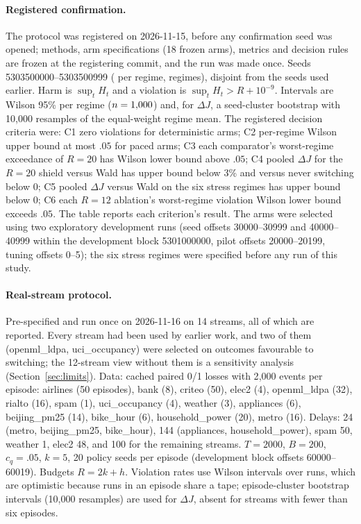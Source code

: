 \documentclass[10pt]{article}
\theoremstyle{plain}
\theoremstyle{definition}
\begin{document}
\paragraph{Registered confirmation.}
The protocol was registered on 2026-11-15, before any confirmation seed was opened; methods, arm specifications (18 frozen arms), metrics and decision rules are frozen at the registering commit, and the run was made once. Seeds 5303500000--5303500999 (\NSeedsPerRegime{} per regime, \NRegimes{} regimes), disjoint from the seeds used earlier. Harm is $\sup_tH_t$ and a violation is $\sup_tH_t>R+10^{-9}$. Intervals are Wilson 95\% per regime ($n=1{,}000$) and, for $\Delta J$, a seed-cluster bootstrap with 10{,}000 resamples of the equal-weight regime mean.
The registered decision criteria were: C1 zero violations for deterministic arms; C2 per-regime Wilson upper bound at most $.05$ for paced arms; C3 each comparator's worst-regime exceedance of $R=20$ has Wilson lower bound above $.05$; C4 pooled $\Delta J$ for the $R=20$ shield versus Wald has upper bound below 3\% and versus never switching below $0$; C5 pooled $\Delta J$ versus Wald on the six stress regimes has upper bound below $0$; C6 each $R=12$ ablation's worst-regime violation Wilson lower bound exceeds $.05$. The table reports each criterion's result. The arms were selected using two exploratory development runs (seed offsets 30000--30999 and 40000--40999 within the development block 5301000000, pilot offsets 20000--20199, tuning offsets 0--5); the six stress regimes were specified before any run of this study.

\paragraph{Real-stream protocol.}
Pre-specified and run once on 2026-11-16 on 14 streams, all of which are reported. Every stream had been used by earlier work, and two of them (openml\_ldpa, uci\_occupancy) were selected on outcomes favourable to switching; the 12-stream view without them is a sensitivity analysis (Section~\ref{sec:limits}). Data: cached paired 0/1 losses with 2{,}000 events per episode: airlines (50 episodes), bank (8), criteo (50), elec2 (4), openml\_ldpa (32), rialto (16), spam (1), uci\_occupancy (4), weather (3), appliances (6), beijing\_pm25 (14), bike\_hour (6), household\_power (20), metro (16). Delays: 24 (metro, beijing\_pm25, bike\_hour), 144 (appliances, household\_power), spam 50, weather 1, elec2 48, and 100 for the remaining streams. $T=2000$, $B=200$, $c_q=.05$, $k=5$, 20 policy seeds per episode (development block offsets 60000--60019). Budgets $R=2k+h$. Violation rates use Wilson intervals over runs, which are optimistic because runs in an episode share a tape; episode-cluster bootstrap intervals (10{,}000 resamples) are used for $\Delta J$, absent for streams with fewer than six episodes.
\end{document}
